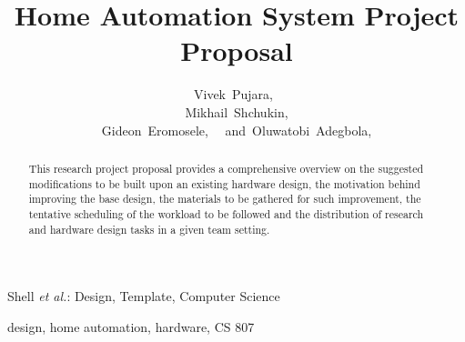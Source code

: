 \documentclass[journal]{IEEEtran}
\begin{document}

\title{Home Automation System Project Proposal }

\author{Vivek~Pujara,~
\\~Mikhail~Shchukin,~
\\~Gideon~Eromosele,~
~and~Oluwatobi~Adegbola,~
}


%
{Shell \MakeLowercase{\textit{et al.}}: Design, Template, Computer Science }


\maketitle

\begin{abstract}
This research project proposal provides a comprehensive overview on the
suggested modifications to be built upon an existing hardware design,
the motivation behind improving the base design, the materials
to be gathered for such improvement, the tentative scheduling of
the workload to be followed and the distribution of research and
hardware design tasks in a given team setting.
\end{abstract}

\begin{IEEEkeywords}
design, home automation, hardware, CS 807
\end{IEEEkeywords}



%
\IEEEpeerreviewmaketitle
\end{document}
